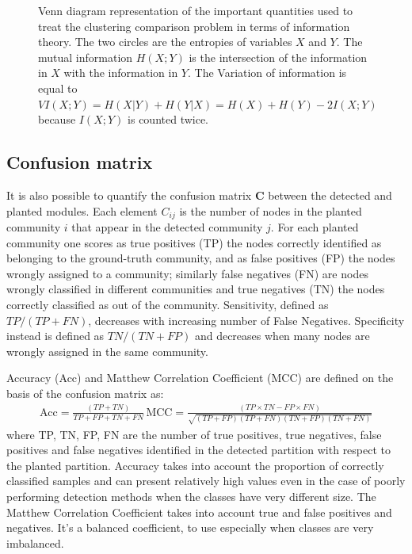 \begin{figure}[htb!]
\centering
{}
\caption{Venn diagram representation of the important quantities used to treat the clustering comparison problem in terms of information theory.
The two circles are the entropies of variables $X$ and $Y$.
The mutual information $H(X;Y)$ is the intersection of the information in $X$ with the information in $Y$.
The Variation of information is equal to $VI(X;Y)=H(X|Y)+H(Y|X)=H(X)+H(Y)-2I(X;Y)$ because $I(X;Y)$ is counted twice.}
\label{fig:venn_diagram}
\end{figure}

\subsection{Confusion matrix}
It is also possible to quantify the confusion matrix $\mathbf{C}$ between the detected and planted modules.
Each element $C_{ij}$ is the number of nodes in the planted community $i$ that appear in the detected community $j$.
For each planted community one scores as true positives (TP) the nodes correctly identified as belonging to the ground-truth community, and as false positives (FP) the nodes wrongly assigned to a community; similarly false negatives (FN) are nodes wrongly classified in different communities and true negatives (TN) the nodes correctly classified as out of the community. Sensitivity, defined as $TP/(TP+FN)$, decreases with increasing number of False Negatives. Specificity instead is defined as $TN/(TN+FP)$ and decreases when many nodes are wrongly assigned in the same community. 

Accuracy (Acc) and Matthew Correlation Coefficient (MCC) are defined on the basis of the confusion matrix as:
\begin{align*}
\textrm{Acc}=\frac{(TP+TN)}{TP+FP+TN+FN} \, \textrm{MCC}=\frac{(TP\times TN-FP\times FN)}{\sqrt{(TP+FP)(TP+FN)(TN+FP)(TN+FN)}}
\end{align*}
where TP, TN, FP, FN are the number of true positives, true negatives, false positives and false negatives identified in the detected partition with respect to the planted partition.
Accuracy takes into account the proportion of correctly classified samples and can present relatively high values even in the case of poorly performing detection methods when the classes have very different size.
The Matthew Correlation Coefficient  takes into account true and false positives and negatives. It's a balanced coefficient, to use especially when classes are very imbalanced.


